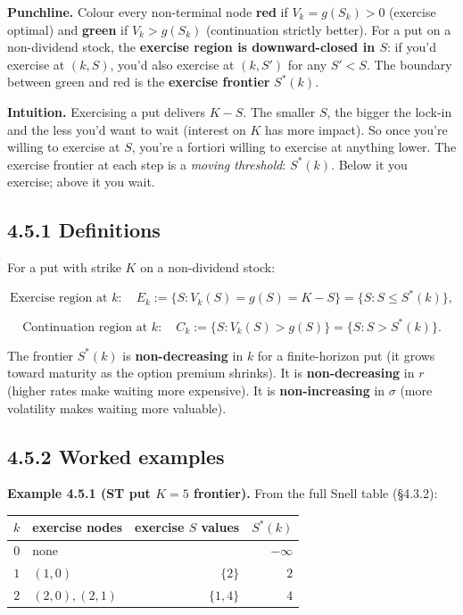 \documentclass[
  10pt,
  twoside]{book}
\newcounter{none} %
\begin{document}
\textbf{Punchline.} Colour every non-terminal node \textbf{red} if
\(V_k = g(S_k) > 0\) (exercise optimal) and \textbf{green} if
\(V_k > g(S_k)\) (continuation strictly better). For a put on a
non-dividend stock, the \textbf{exercise region is downward-closed in
\(S\)}: if you'd exercise at \((k, S)\), you'd also exercise at
\((k, S')\) for any \(S' < S\). The boundary between green and red is
the \textbf{exercise frontier} \(S^*(k)\).

\textbf{Intuition.} Exercising a put delivers \(K - S\). The smaller
\(S\), the bigger the lock-in and the less you'd want to wait (interest
on \(K\) has more impact). So once you're willing to exercise at \(S\),
you're a fortiori willing to exercise at anything lower. The exercise
frontier at each step is a \emph{moving threshold}: \(S^*(k)\). Below it
you exercise; above it you wait.

\subsection{4.5.1 Definitions}\label{definitions-14}

For a put with strike \(K\) on a non-dividend stock:

\[\text{Exercise region at } k : \quad E_k := \{S : V_k(S) = g(S) = K - S\} = \{S : S \le S^*(k)\},\]

\[\text{Continuation region at } k : \quad C_k := \{S : V_k(S) > g(S)\} = \{S : S > S^*(k)\}.\]

The frontier \(S^*(k)\) is \textbf{non-decreasing} in \(k\) for a
finite-horizon put (it grows toward maturity as the option premium
shrinks). It is \textbf{non-decreasing} in \(r\) (higher rates make
waiting more expensive). It is \textbf{non-increasing} in \(\sigma\)
(more volatility makes waiting more valuable).

\subsection{4.5.2 Worked examples}\label{worked-examples-1}

\textbf{Example 4.5.1 (ST put \(K=5\) frontier).} From the full Snell
table (§4.3.2):

{\def\LTcaptype{none} %
\begin{table}[H]
\centering
\begin{tabular}{|c|l|r|r|}
\toprule
\(k\) & exercise nodes & exercise \(S\) values & \(S^*(k)\) \\
\midrule



\(0\) & none & & \(-\infty\) \\
\(1\) & \((1,0)\) & \(\{2\}\) & \(2\) \\
\(2\) & \((2,0), (2,1)\) & \(\{1, 4\}\) & \(4\) \\
\bottomrule
\end{tabular}
\end{table}
}
\end{document}
